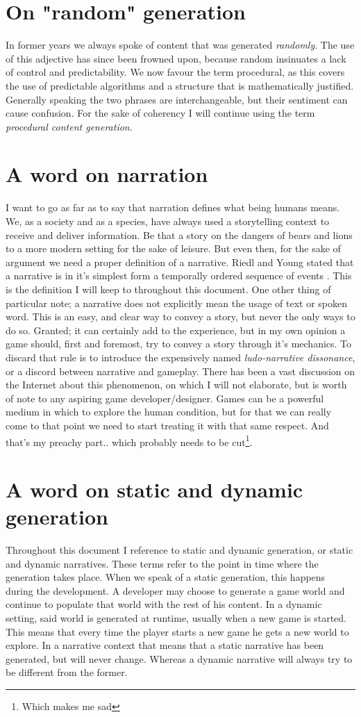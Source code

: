 \section{On "random" generation}
In former years we always spoke of content that was generated \emph{randomly}. The use of this adjective has since been frowned upon, because random insinuates a lack of control and predictability. We now favour the term procedural, as this covers the use of predictable algorithms and a structure that is mathematically justified. Generally speaking the two phrases are interchangeable, but their sentiment can cause confusion. For the sake of coherency I will continue using the term \textit{procedural content generation}.
\section{A word on narration}
I want to go as far as to say that narration defines what being humans means. We, as a society and as a species, have always used a storytelling context to receive and deliver information. Be that a story on the dangers of bears and lions to a more modern setting for the sake of leisure. But even then, for the sake of argument we need a proper definition of a narrative. Riedl and Young stated that a narrative is in it's simplest form a temporally ordered sequence of events \citep{Riedl:2004:IPM:1018409.1018753}. This is the definition I will keep to throughout this document. One other thing of particular note; a narrative does not explicitly mean the usage of text or spoken word. This is an easy, and clear way to convey a story, but never the only ways to do so. Granted; it can certainly add to the experience, but in my own opinion a game should, first and foremost, try to convey a story through it's mechanics. To discard that rule is to introduce the expensively named \textit{ludo-narrative dissonance}, or a discord between narrative and gameplay. There has been a vast discussion on the Internet about this phenomenon, on which I will not elaborate, but is worth of note to any aspiring game developer/designer. Games can be a powerful medium in which to explore the human condition, but for that we can really come to that point we need to start treating it with that same respect. And that's my preachy part.. which probably needs to be cut\footnote{Which makes me sad}.
\section{A word on static and dynamic generation}
\label{sec:static_dynamic_generation}
Throughout this document I reference to static and dynamic generation, or static and dynamic narratives. These terms refer to the point in time where the generation takes place. When we speak of a static generation, this happens during the development. A developer may choose to generate a game world and continue to populate that world with the rest of his content. In a dynamic setting, said world is generated at runtime, usually when a new game is started. This means that every time the player starts a new game he gets a new world to explore. In a narrative context that means that a static narrative has been generated, but will never change. Whereas a dynamic narrative will always try to be different from the former.
